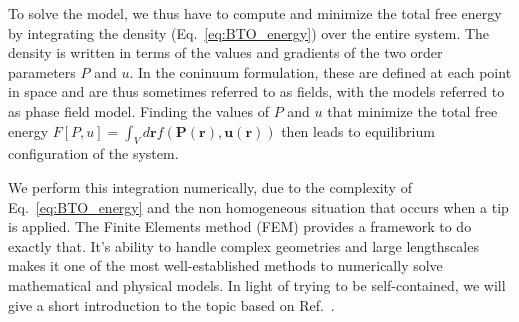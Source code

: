 To solve the model, we thus have to compute and minimize the total free energy by integrating the density (Eq.~\ref{eq:BTO_energy}) over the entire system.
The density is written in terms of the values and gradients of the two order parameters $P$ and $u$.
In the coninuum formulation, these are defined at each point in space and are thus sometimes referred to as fields, with the models referred to as phase field model.
Finding the values of $P$ and $u$ that minimize the total free energy $F[P,u]=\int_V d\bm{r} f(\bm{P}(\bm{r}),\bm{u}(\bm{r}))$ then leads to equilibrium configuration of the system.

We perform this integration numerically, due to the complexity of Eq.~\ref{eq:BTO_energy} and the non homogeneous situation that occurs when a tip is applied.
The Finite Elements method (FEM) provides a framework to do exactly that.
It's ability to handle complex geometries and large lengthscales makes it one of the most well-established methods to numerically solve mathematical and physical models.
In light of trying to be self-contained, we will give a short introduction to the topic based on Ref.~\cite{Biner}.

